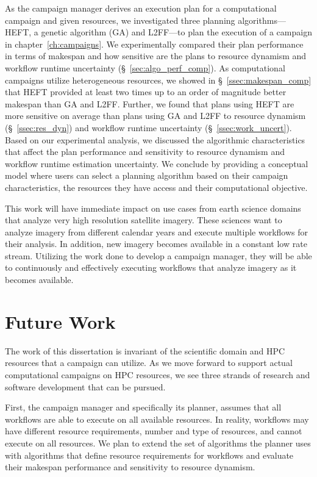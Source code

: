 As the campaign manager derives an execution plan for a computational campaign 
and given resources, we investigated three planning algorithms---HEFT, a 
genetic algorithm (GA) and L2FF---to plan the execution of a campaign in 
chapter~\ref{ch:campaigns}. We experimentally compared their plan performance 
in terms of makespan and how sensitive are the plans to resource dynamism and 
workflow runtime uncertainty (\S~\ref{sec:algo_perf_comp}). As computational 
campaigns utilize heterogeneous resources, we showed in 
\S~\ref{ssec:makespan_comp} that HEFT provided at least two times up to an 
order of magnitude better makespan than GA and L2FF. Further, we found that 
plans using HEFT are more sensitive on average than plans using GA and L2FF to 
resource dynamism (\S~\ref{ssec:res_dyn}) and workflow runtime uncertainty 
(\S~\ref{ssec:work_uncert}). Based on our experimental analysis, we discussed 
the algorithmic characteristics that affect the plan performance and 
sensitivity to resource dynamism and workflow runtime estimation uncertainty. 
We conclude by providing a conceptual model where users can select a planning 
algorithm based on their campaign characteristics, the resources they have 
access and their computational objective.

This work will have immediate impact on use cases from earth science domains 
that analyze very high resolution satellite imagery. These sciences want to 
analyze imagery from different calendar years and execute multiple 
workflows for their analysis. In addition, new imagery becomes available in 
a constant low rate stream. Utilizing the work done to develop a campaign 
manager, they will be able to continuously and effectively executing workflows 
that analyze imagery as it becomes available.

\section{Future Work}

The work of this dissertation is invariant of the scientific domain and HPC
resources that a campaign can utilize. As we move forward to support actual
computational campaigns on HPC resources, we see three strands of research and
software development that can be pursued.

First, the campaign manager and specifically its planner, assumes that all
workflows are able to execute on all available resources. In reality,
workflows may have different resource requirements, number and type of
resources, and cannot execute on all resources. We plan to extend the set of
algorithms the planner uses with algorithms that define resource requirements
for workflows and evaluate their makespan performance and sensitivity to
resource dynamism.

